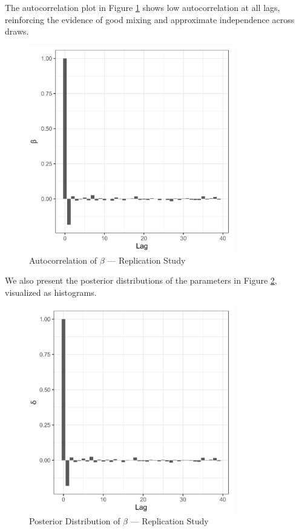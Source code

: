 The autocorrelation plot in Figure \ref{fig:replication_autocorrelation} shows low autocorrelation at all lags, reinforcing the evidence of good mixing and approximate independence across draws.

\begin{figure}[H]
\centering
\includegraphics[width=0.8\textwidth]{../figures/acemoglu/acf_beta.png}
\caption{Autocorrelation of $\beta$ --- Replication Study}
\label{fig:replication_autocorrelation}
\end{figure}

We also present the posterior distributions of the parameters in Figure \ref{fig:replication_posterior_distributions}, visualized as histograms.

\begin{figure}[H]
\centering
\includegraphics[width=0.8\textwidth]{../figures/acemoglu/hist_beta.png}
\caption{Posterior Distribution of $\beta$ --- Replication Study}
\label{fig:replication_posterior_distributions}
\end{figure}


